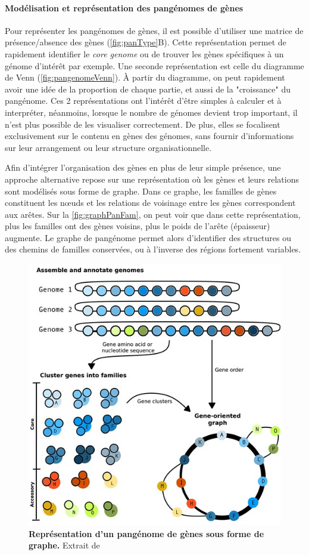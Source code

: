 \paragraph{Modélisation et représentation des pangénomes de gènes}

Pour représenter les pangénomes de gènes, il est possible d'utiliser une matrice de présence/absence des gènes (\autoref{fig:panType}B). Cette représentation permet de rapidement identifier le \textit{core genome} ou de trouver les gènes spécifiques à un génome d'intérêt par exemple. Une seconde représentation est celle du diagramme de Venn (\autoref{fig:pangenomeVenn}). À partir du diagramme, on peut rapidement avoir une idée de la proportion de chaque partie, et aussi de la "croissance" du pangénome. Ces 2 représentations ont l'intérêt d'être simples à calculer et à interpréter, néanmoins, lorsque le nombre de génomes devient trop important, il n'est plus possible de les visualiser correctement. De plus, elles se focalisent exclusivement sur le contenu en gènes des génomes, sans fournir d’informations sur leur arrangement ou leur structure organisationnelle.

Afin d’intégrer l’organisation des gènes en plus de leur simple présence, une approche alternative repose sur une représentation où les gènes et leurs relations sont modélisés sous forme de graphe. Dans ce graphe, les familles de gènes constituent les n\oe uds et les relations de voisinage entre les gènes correspondent aux arêtes. Sur la \autoref{fig:graphPanFam}, on peut voir que dans cette représentation, plus les familles ont des gènes voisins, plus le poids de l'arête (épaisseur) augmente. Le graphe de pangénome permet alors d'identifier des structures ou des chemins de familles conservées, ou à l'inverse des régions fortement variables.

\begin{figure}[htbp]
    \centering
    \includegraphics[width=0.8\linewidth]{images/graphePanFam.jpeg}
    \caption[Représentation d'un pangénome de gènes sous forme de graphe]{\textbf{Représentation d'un pangénome de gènes sous forme de graphe.} Extrait de \cite{matthews_gentle_2024}}
    \label{fig:graphPanFam}
\end{figure}

